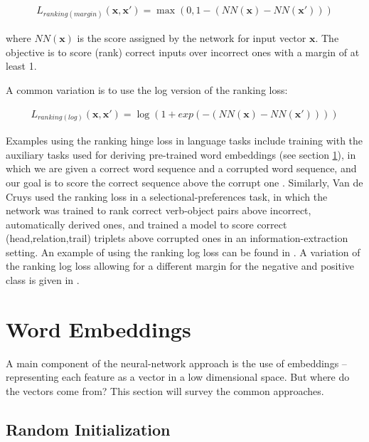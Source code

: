 \documentclass[jair,twoside,11pt,theapa]{article}
\newcommand{\m}[1]{\mathbf{#1}}%
\newcommand{\ygcomment}[1]{\textbf{[TODO: #1]}}
\renewcommand{\ygcomment}[1]{}
\renewcommand{\shortcite}[0]{\citeyear}
\begin{document}
{\begin{align*}
    L_{ranking(margin)}(\m{x},\m{x'}) = \max(0, 1 - (NN(\m{x}) - NN(\m{x'})))
\end{align*}

\noindent where $NN(\m{x})$ is the score assigned by the network for input vector
$\m{x}$.  The objective is to score (rank) correct inputs over incorrect ones with a
margin of at least 1.  

A common variation is to use the log version of the ranking loss:

\begin{align*}
    L_{ranking(log)}(\m{x},\m{x'}) = \log(1 + exp(-(NN(\m{x}) - NN(\m{x'}))))
\end{align*}

Examples using the ranking hinge loss in language tasks include training with the
auxiliary tasks used for deriving pre-trained word embeddings
(see section \ref{sec:word-embed}), in which we are given a correct word sequence and a
corrupted word sequence, and our goal is to score the correct sequence above
the corrupt one \cite{collobert2008unified}.  Similarly, Van de Cruys \shortcite{vandecruys2014neural} used the
ranking loss in a selectional-preferences task, in which the network was trained
to rank correct verb-object pairs above incorrect, automatically derived ones,
and \cite{weston2013connecting} trained a model to score correct
(head,relation,trail) triplets above corrupted ones in an information-extraction
setting.  An example of using the ranking log loss can be found in
\cite{gao2014modeling}.  A variation of the ranking log loss allowing for a
different margin for the negative and positive class is given in \cite{dossantos2015classifying}.
\ygcomment{Do we really need dos santos here?}



\clearpage
\section{Word Embeddings}
\label{sec:word-embed}

A main component of the neural-network approach is the use of embeddings -- representing each feature as a vector in a low dimensional space.
But where do the vectors come from? This section will survey the common approaches.

\subsection{Random Initialization}

}
\end{document}
